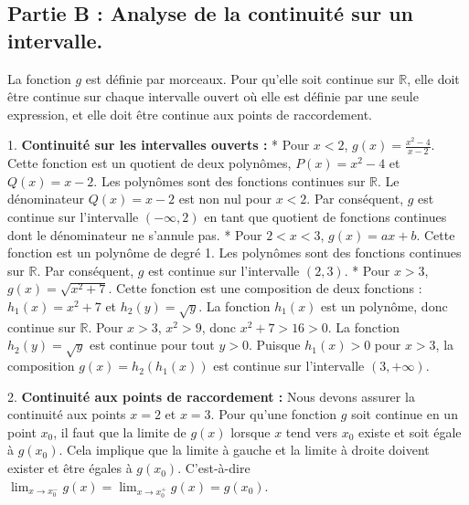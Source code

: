 \documentclass[12pt,a4paper]{report}
\begin{document}
\subsection{Partie B : Analyse de la continuité sur un intervalle.}

La fonction $g$ est définie par morceaux. Pour qu'elle soit continue sur $\mathbb{R}$, elle doit être continue sur chaque intervalle ouvert où elle est définie par une seule expression, et elle doit être continue aux points de raccordement.

1.  \textbf{Continuité sur les intervalles ouverts :}
    *   Pour $x < 2$, $g(x) = \frac{x^2 - 4}{x - 2}$. Cette fonction est un quotient de deux polynômes, $P(x) = x^2 - 4$ et $Q(x) = x - 2$. Les polynômes sont des fonctions continues sur $\mathbb{R}$. Le dénominateur $Q(x) = x - 2$ est non nul pour $x < 2$. Par conséquent, $g$ est continue sur l'intervalle $(-\infty, 2)$ en tant que quotient de fonctions continues dont le dénominateur ne s'annule pas.
    *   Pour $2 < x < 3$, $g(x) = ax + b$. Cette fonction est un polynôme de degré 1. Les polynômes sont des fonctions continues sur $\mathbb{R}$. Par conséquent, $g$ est continue sur l'intervalle $(2, 3)$.
    *   Pour $x > 3$, $g(x) = \sqrt{x^2 + 7}$. Cette fonction est une composition de deux fonctions : $h_1(x) = x^2 + 7$ et $h_2(y) = \sqrt{y}$. La fonction $h_1(x)$ est un polynôme, donc continue sur $\mathbb{R}$. Pour $x > 3$, $x^2 > 9$, donc $x^2 + 7 > 16 > 0$. La fonction $h_2(y) = \sqrt{y}$ est continue pour tout $y > 0$. Puisque $h_1(x) > 0$ pour $x > 3$, la composition $g(x) = h_2(h_1(x))$ est continue sur l'intervalle $(3, +\infty)$.

2.  \textbf{Continuité aux points de raccordement :}
    Nous devons assurer la continuité aux points $x = 2$ et $x = 3$. Pour qu'une fonction $g$ soit continue en un point $x_0$, il faut que la limite de $g(x)$ lorsque $x$ tend vers $x_0$ existe et soit égale à $g(x_0)$. Cela implique que la limite à gauche et la limite à droite doivent exister et être égales à $g(x_0)$. C'est-à-dire $\lim_{x \to x_0^-} g(x) = \lim_{x \to x_0^+} g(x) = g(x_0)$.
\end{document}
